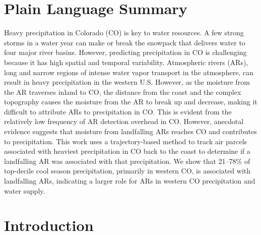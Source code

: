 \documentclass[draft]{agujournal2019}
\begin{document}
\section*{Plain Language Summary}
Heavy precipitation in Colorado (CO) is key to water resources. A few strong storms in a water year can make or break the snowpack that delivers water to four major river basins. However, predicting precipitation in CO is challenging because it has high spatial and temporal variability. Atmospheric rivers (ARs), long and narrow regions of intense water vapor transport in the atmosphere, can result in heavy precipitation in the western U.S. However, as the moisture from the AR traverses inland to CO, the distance from the coast and the complex topography causes the moisture from the AR to break up and decrease, making it difficult to attribute ARs to precipitation in CO. This is evident from the relatively low frequency of AR detection overhead in CO. However, anecdotal evidence suggests that moisture from landfalling ARs reaches CO and contributes to precipitation. This work uses a trajectory-based method to track air parcels associated with heaviest precipitation in CO back to the coast to determine if a landfalling AR was associated with that precipitation. We show that 21--78\% of top-decile cool season precipitation, primarily in western CO, is associated with landfalling ARs, indicating a larger role for ARs in western CO precipitation and water supply.

%
%

\section{Introduction}
\label{intro}
\end{document}
